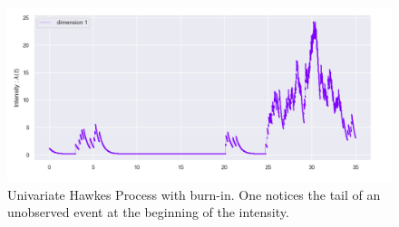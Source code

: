 \begin{figure}
\centering
\includegraphics[width = 0.99 \textwidth]{../imag/burnin.png}
\caption{Univariate Hawkes Process with burn-in. One notices the tail of an unobserved event at the beginning of the intensity.}
\label{fig:burn-in}
\end{figure}









